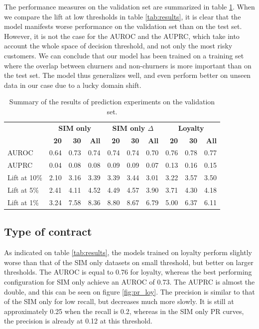 The performance measures on the validation set are summarized in table
\ref{tab:results_valid}. When we compare the lift at low thresholds in table
\ref{tab:results}, it is clear that the model manifests worse performance on the
validation set than on the test set. However, it is not the case for the AUROC
and the AUPRC, which take into account the whole space of decision threshold,
and not only the most risky customers. We can conclude that our model has been
trained on a training set where the overlap between churners and non-churners is
more important than on the test set. The model thus generalizes well, and even
perform better on unseen data in our case due to a lucky domain shift.

\begin{table}
    \centering
    \begin{tabular}{lrrrrrrrrr}
        \toprule
        & \multicolumn{3}{c}{\textbf{SIM only}}
        & \multicolumn{3}{c}{\textbf{SIM only $\Delta$}}
        & \multicolumn{3}{c}{\textbf{Loyalty}} \\
        \cmidrule(l){2-4} \cmidrule(l){5-7} \cmidrule(l){8-10}
        & \textbf{20} & \textbf{30} & \textbf{All} & \textbf{20} & \textbf{30} &
        \textbf{All} & \textbf{20} & \textbf{30} & \textbf{All} \\
        \midrule
        AUROC & 0.64 & 0.73 & 0.74 & 0.74 & 0.74 & 0.70 & 0.76 & 0.78 & 0.77 \\
        AUPRC & 0.04 & 0.08 & 0.08 & 0.09 & 0.09 & 0.07 & 0.13 & 0.16 & 0.15 \\
        Lift at 10\%  & 2.10 & 3.16 & 3.39 & 3.39 & 3.44 & 3.01 & 3.22 & 3.57 & 3.50 \\
        Lift at  5\%  & 2.41 & 4.11 & 4.52 & 4.49 & 4.57 & 3.90 & 3.71 & 4.30 & 4.18 \\
        Lift at  1\%  & 3.24 & 7.58 & 8.36 & 8.80 & 8.67 & 6.79 & 5.00 & 6.37 & 6.11 \\
        \bottomrule
    \end{tabular}
    \caption{Summary of the results of prediction experiments on the validation
    set.}
    \label{tab:results_valid}
\end{table}

\subsection{Type of contract}

As indicated on table \ref{tab:results}, the models trained on loyalty perform
slightly worse than that of the SIM only datasets on small threshold, but better
on larger thresholds. The AUROC is equal to 0.76 for loyalty, whereas the best
performing configuration for SIM only achieve an AUROC of 0.73. The AUPRC is
almost the double, and this can be seen on figure \ref{fig:pr_loy}. The
precision is similar to that of the SIM only for low recall, but decreases much
more slowly. It is still at approximately 0.25 when the recall is 0.2, whereas
in the SIM only PR curves, the precision is already at 0.12 at this threshold.

